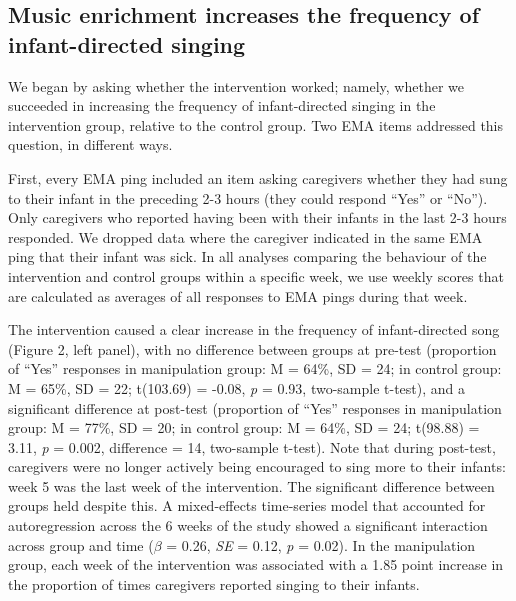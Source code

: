 \documentclass[
]{article}
\begin{document}
\subsection{Music enrichment increases the frequency of infant-directed
singing}\label{music-enrichment-increases-the-frequency-of-infant-directed-singing}

We began by asking whether the intervention worked; namely, whether we
succeeded in increasing the frequency of infant-directed singing in the
intervention group, relative to the control group. Two EMA items
addressed this question, in different ways.

First, every EMA ping included an item asking caregivers whether they
had sung to their infant in the preceding 2-3 hours (they could respond
``Yes'' or ``No''). Only caregivers who reported having been with their
infants in the last 2-3 hours responded. We dropped data where the
caregiver indicated in the same EMA ping that their infant was sick. In
all analyses comparing the behaviour of the intervention and control
groups within a specific week, we use weekly scores that are calculated
as averages of all responses to EMA pings during that week.

The intervention caused a clear increase in the frequency of
infant-directed song (Figure 2, left panel), with no difference between
groups at pre-test (proportion of ``Yes'' responses in manipulation
group: M = 64\%, SD = 24; in control group: M = 65\%, SD = 22; t(103.69)
= -0.08, \emph{p} = 0.93, two-sample t-test), and a significant
difference at post-test (proportion of ``Yes'' responses in manipulation
group: M = 77\%, SD = 20; in control group: M = 64\%, SD = 24; t(98.88)
= 3.11, \emph{p} = 0.002, difference = 14, two-sample t-test). Note that
during post-test, caregivers were no longer actively being encouraged to
sing more to their infants: week 5 was the last week of the
intervention. The significant difference between groups held despite
this. A mixed-effects time-series model that accounted for
autoregression across the 6 weeks of the study showed a significant
interaction across group and time (\(\beta\) = 0.26, \emph{SE} = 0.12,
\emph{p} = 0.02). In the manipulation group, each week of the
intervention was associated with a 1.85 point increase in the proportion
of times caregivers reported singing to their infants.
\end{document}

